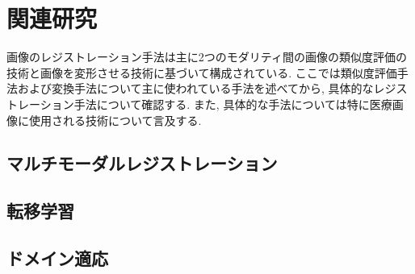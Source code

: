 \chapter{関連研究}
\thispagestyle{fancy} %


画像のレジストレーション手法は主に2つのモダリティ間の画像の類似度評価の技術と画像を変形させる技術に基づいて構成されている.
ここでは類似度評価手法および変換手法について主に使われている手法を述べてから, 具体的なレジストレーション手法について確認する.
また, 具体的な手法については特に医療画像に使用される技術について言及する.

\section{マルチモーダルレジストレーション}

 
\section{転移学習}


\section{ドメイン適応}

